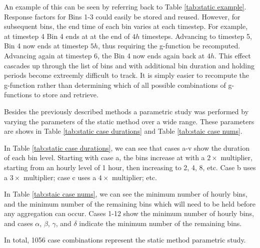 \documentclass[review,12pt]{elsarticle}
\begin{document}
An example of this can be seen by referring back to Table \ref{tab:static example}. Response factors for Bins 1-3 could easily be stored and reused. However, for subsequent bins, the end time of each bin varies at each timestep. For example, at timestep 4 Bin 4 ends at at the end of $4h$ timesteps. Advancing to timestep 5, Bin 4 now ends at timestep $5h$, thus requiring the g-function be recomputed. Advancing again at timestep 6, the Bin 4 now ends again back at $4h$. This effect cascades up through the list of bins and with additional bin duration and holding periods become extreemly difficult to track. It is simply easier to recompute the g-function rather than determining which of all possible combinations of g-functions to store and retrieve.

Besides the previously described methods \citep{YavuzturkSpitler1999, BernierPinelLabibPaillot2004, Liu2005} a parametric study was performed by varying the parameters of the static method over a wide range. These parameters are shows in Table \ref{tab:static case durations} and Table \ref{tab:staic case nums}. 

In Table \ref{tab:static case durations}, we can see that cases a-v show the duration of each bin level. Starting with case a, the bins increase at with a $2\times$ multiplier, starting from an hourly level of 1 hour, then increasing to 2, 4, 8, etc. Case b uses a $3\times$ multiplier; case c uses a $4\times$ multiplier; etc.

In Table \ref{tab:staic case nums}, we can see the minimum number of hourly bins, and the minimum number of the remaining bins which will need to be held before any aggregation can occur. Cases 1-12 show the minimum number of hourly bins, and cases $\alpha$, $\beta$, $\gamma$, and $\delta$ indicate the minimum number of the remaining bins.

In total, 1056 case combinations represent the static method parametric study.
\end{document}
